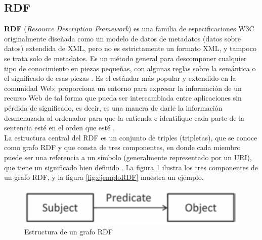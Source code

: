 

\subsection{RDF} %

\textbf{RDF} (\textit{Resource Description Framework}) es una familia de especificaciones W3C originalmente diseñada como un modelo de datos de metadatos (datos sobre datos) extendida de XML, pero no es estrictamente un formato XML, y tampoco se trata solo de metadatos. Es un método general para descomponer cualquier tipo de conocimiento en piezas pequeñas, con algunas reglas sobre la semántica o el significado de esas piezas \cite{libro-gis}. Es el estándar más popular y extendido en la comunidad Web; proporciona un entorno para expresar la información de un recurso Web de tal forma que pueda ser intercambiada entre aplicaciones sin pérdida de significado, es decir, es una manera de darle la información desmenuzada al ordenador para que la entienda e identifique cada parte de la sentencia esté en el orden que esté \cite{aplicacion}. \\

La estructura central del RDF es un conjunto de triples (tripletas), que se conoce como grafo RDF y que consta de tres componentes, en donde cada miembro puede ser una referencia a un símbolo (generalmente representado por un URI), que tiene un significado bien definido \cite{web-semantica-w3c}. La figura \ref{fig:tripleta} ilustra los tres componentes de un grafo RDF, y la figura \ref{fig:ejemploRDF} muestra un ejemplo.

\begin{figure}[H]
	\centering
	\includegraphics[width=0.46\linewidth]{imagenes/capitulo3/tripleta1}
	\caption{Estructura de un grafo RDF}
	\label{fig:tripleta}
\end{figure}

